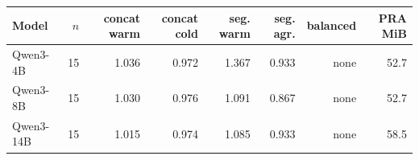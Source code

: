 \begin{tabular}{lrrrrrrr}
\toprule
Model & $n$ & concat warm & concat cold & seg. warm & seg. agr. & balanced & PRA MiB \\
\midrule
Qwen3-4B & 15 & 1.036 & 0.972 & 1.367 & 0.933 & none & 52.7 \\
Qwen3-8B & 15 & 1.030 & 0.976 & 1.091 & 0.867 & none & 52.7 \\
Qwen3-14B & 15 & 1.015 & 0.974 & 1.085 & 0.933 & none & 58.5 \\
\bottomrule
\end{tabular}
